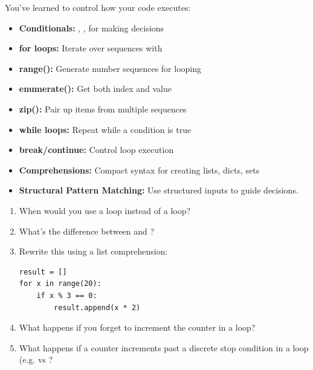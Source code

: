 You've learned to control how your code executes:

\begin{itemize}
    \item \textbf{Conditionals:} , ,  for making decisions
    \item \textbf{for loops:} Iterate over sequences with 
    \item \textbf{range():} Generate number sequences for looping
    \item \textbf{enumerate():} Get both index and value
    \item \textbf{zip():} Pair up items from multiple sequences
    \item \textbf{while loops:} Repeat while a condition is true
    \item \textbf{break/continue:} Control loop execution
    \item \textbf{Comprehensions:} Compact syntax for creating lists, dicts, sets
    \item \textbf{Structural Pattern Matching:} Use structured inputs to guide decisions.
\end{itemize}

\begin{ponder}
\begin{enumerate}
    \item When would you use a  loop instead of a  loop?
    \item What's the difference between  and ?
    \item Rewrite this using a list comprehension:
    \begin{lstlisting}
result = []
for x in range(20):
    if x % 3 == 0:
        result.append(x * 2)
    \end{lstlisting}
    \item What happens if you forget to increment the counter in a  loop?
	\item What happens if a counter increments past a discrete stop condition in a  loop (e.g.  vs ?
\end{enumerate}
\end{ponder}
